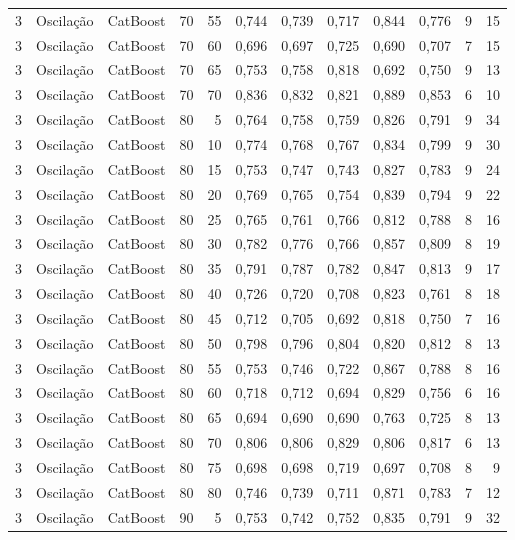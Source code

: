 \begin{longtable}{@{}rllrrrrrrrrr@{}}
3 & Oscilação & CatBoost & 70 & 55 & 0,744 & 0,739 & 0,717 & 0,844 & 0,776 & 9 & 15 \\
3 & Oscilação & CatBoost & 70 & 60 & 0,696 & 0,697 & 0,725 & 0,690 & 0,707 & 7 & 15 \\
3 & Oscilação & CatBoost & 70 & 65 & 0,753 & 0,758 & 0,818 & 0,692 & 0,750 & 9 & 13 \\
3 & Oscilação & CatBoost & 70 & 70 & 0,836 & 0,832 & 0,821 & 0,889 & 0,853 & 6 & 10 \\
3 & Oscilação & CatBoost & 80 & 5 & 0,764 & 0,758 & 0,759 & 0,826 & 0,791 & 9 & 34 \\
3 & Oscilação & CatBoost & 80 & 10 & 0,774 & 0,768 & 0,767 & 0,834 & 0,799 & 9 & 30 \\
3 & Oscilação & CatBoost & 80 & 15 & 0,753 & 0,747 & 0,743 & 0,827 & 0,783 & 9 & 24 \\
3 & Oscilação & CatBoost & 80 & 20 & 0,769 & 0,765 & 0,754 & 0,839 & 0,794 & 9 & 22 \\
3 & Oscilação & CatBoost & 80 & 25 & 0,765 & 0,761 & 0,766 & 0,812 & 0,788 & 8 & 16 \\
3 & Oscilação & CatBoost & 80 & 30 & 0,782 & 0,776 & 0,766 & 0,857 & 0,809 & 8 & 19 \\
3 & Oscilação & CatBoost & 80 & 35 & 0,791 & 0,787 & 0,782 & 0,847 & 0,813 & 9 & 17 \\
3 & Oscilação & CatBoost & 80 & 40 & 0,726 & 0,720 & 0,708 & 0,823 & 0,761 & 8 & 18 \\
3 & Oscilação & CatBoost & 80 & 45 & 0,712 & 0,705 & 0,692 & 0,818 & 0,750 & 7 & 16 \\
3 & Oscilação & CatBoost & 80 & 50 & 0,798 & 0,796 & 0,804 & 0,820 & 0,812 & 8 & 13 \\
3 & Oscilação & CatBoost & 80 & 55 & 0,753 & 0,746 & 0,722 & 0,867 & 0,788 & 8 & 16 \\
3 & Oscilação & CatBoost & 80 & 60 & 0,718 & 0,712 & 0,694 & 0,829 & 0,756 & 6 & 16 \\
3 & Oscilação & CatBoost & 80 & 65 & 0,694 & 0,690 & 0,690 & 0,763 & 0,725 & 8 & 13 \\
3 & Oscilação & CatBoost & 80 & 70 & 0,806 & 0,806 & 0,829 & 0,806 & 0,817 & 6 & 13 \\
3 & Oscilação & CatBoost & 80 & 75 & 0,698 & 0,698 & 0,719 & 0,697 & 0,708 & 8 & 9 \\
3 & Oscilação & CatBoost & 80 & 80 & 0,746 & 0,739 & 0,711 & 0,871 & 0,783 & 7 & 12 \\
3 & Oscilação & CatBoost & 90 & 5 & 0,753 & 0,742 & 0,752 & 0,835 & 0,791 & 9 & 32 \\

\end{longtable}
